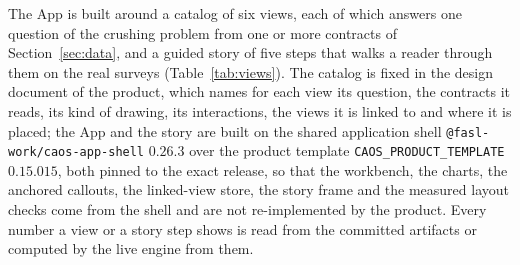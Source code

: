 The App is built around a catalog of six views, each of which answers one question of the crushing problem from one or more
contracts of Section~\ref{sec:data}, and a guided story of five steps that walks a reader through them on the real surveys
(Table~\ref{tab:views}). The catalog is fixed in the design document of the product, which names for each view its question, the
contracts it reads, its kind of drawing, its interactions, the views it is linked to and where it is placed; the App and the story
are built on the shared application shell \texttt{@fasl-work/\allowbreak{}caos-app-shell} $0.26.3$ over the product template
\texttt{CAOS\_PRODUCT\_TEMPLATE} $0.15.015$, both pinned to the exact release, so that the workbench, the charts, the anchored callouts,
the linked-view store, the story frame and the measured layout checks come from the shell and are not re-implemented by the product.
Every number a view or a story step shows is read from the committed artifacts or computed by the live engine from them.


